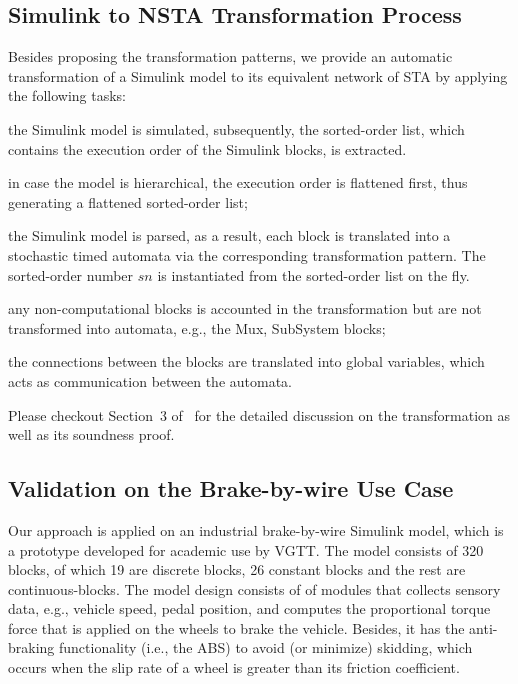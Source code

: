 \subsection*{Simulink to NSTA Transformation Process} 
Besides proposing the transformation patterns, we provide an automatic transformation of a Simulink model to its equivalent network of STA by applying the following tasks:
\begin{enumerate*}[label=(\roman*)]
	\item the Simulink model is simulated, subsequently, the sorted-order list, which contains the execution order of the Simulink blocks, is extracted.
	\item in case the model is hierarchical, the execution order is flattened first, thus generating a flattened sorted-order list;
	\item the Simulink model is parsed, as a result, each block is translated into a stochastic timed automata via the corresponding transformation pattern. The sorted-order number $sn$ is instantiated from the sorted-order list on the fly.
	\item any non-computational blocks is accounted in the transformation but are not transformed into automata, e.g., the Mux, SubSystem blocks;
	\item the connections between the blocks are translated into global variables, which acts as communication between the automata.
\end{enumerate*}
Please checkout Section~3 of~\cite{Filipovikj2018SimppaalModels} for the detailed discussion on the transformation as well as its soundness proof.


\subsection*{Validation on the Brake-by-wire Use Case} 
Our approach is applied on an industrial brake-by-wire Simulink model, which is a prototype developed for academic use by VGTT. The model consists of 320 blocks, of which 19 are discrete blocks, 26 constant blocks and the rest are continuous-blocks. The model design consists of of modules that collects sensory data, e.g., vehicle speed, pedal position, and computes the proportional torque force that is applied on the wheels to brake the vehicle. Besides, it has the  anti-braking functionality (i.e., the ABS) to avoid (or minimize) skidding, which occurs when the slip rate of a wheel is greater than its friction coefficient. 

